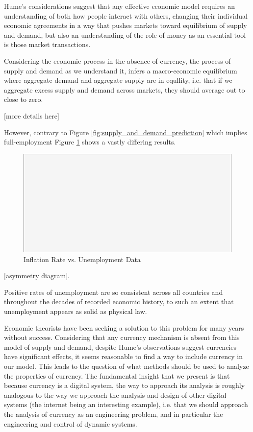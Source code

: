 Hume's considerations suggest that any effective economic model requires an understanding of both
how people interact with others, changing their individual economic agreements in a way that pushes
markets toward equilibrium of supply and demand, but also an understanding of the role of money as
an essential tool is those market transactions.

Considering the economic process in the absence of currency, the process of supply and demand as we
understand it, infers a macro-economic equilibrium where aggregate demand and aggregate supply are
in equllity, i.e. that if we aggregate excess supply and demand across markets, they should average
out to close to zero.

[more details here]




However, contrary to Figure \ref{fig:supply_and_demand_prediction} which implies full-employment
Figure \ref{fig:ui_all_data} shows a vastly differing results.

\begin{figure}[H]
\centering
\includegraphics[scale=0.48]{blank}
\caption{Inflation Rate vs. Unemployment Data}
\label{fig:ui_all_data}
\end{figure}

[asymmetry diagram].

Positive rates of unemployment are so consistent across all countries and throughout the decades of
recorded economic history, to such an extent that unemployment appears as solid as physical law.

Economic theorists have been seeking a solution to this problem for many years without success.
Considering that any currency mechanism is absent from this model of supply and demand, despite
Hume's observations suggest currencies have significant effects, it seems reasonable to find a way
to include currency in our model. This leads to the question of what methods should be used to
analyze the properties of currency. The fundamental insight that we present is that because currency
is a digital system, the way to approach its analysis is roughly analogous to the way we approach
the analysis and design of other digital systems (the internet being an interesting example), i.e.
that we should approach the analysis of currency as an engineering problem, and in particular the
engineering and control of dynamic systems. 

